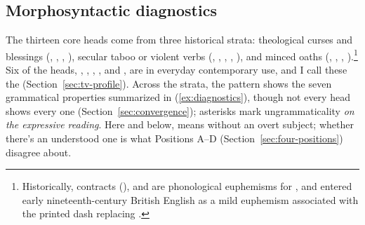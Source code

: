 \documentclass[12pt]{article}
\begin{document}
\subsection{Morphosyntactic diagnostics}
\label{sec:diagnostics}

The thirteen core heads come from three historical strata: theological curses and blessings (, , , ), secular taboo or violent verbs (, , , , ), and minced oaths (, , , ).\footnote{Historically,  contracts (),  and  are phonological euphemisms for , and  entered early nineteenth-century British English as a mild euphemism associated with the printed dash replacing  \citep{mcenery2006,allanburridge2006,ljung2011}.} Six of the heads, , , , ,  and , are in everyday contemporary use, and I call these the  (Section~\ref{sec:tv-profile}). Across the strata, the pattern shows the seven grammatical properties summarized in (\ref{ex:diagnostics}), though not every head shows every one (Section~\ref{sec:convergence}); asterisks mark ungrammaticality \emph{on the expressive reading}. Here and below,  means without an overt subject; whether there's an understood one is what Positions A--D (Section~\ref{sec:four-positions}) disagree about.
\end{document}
